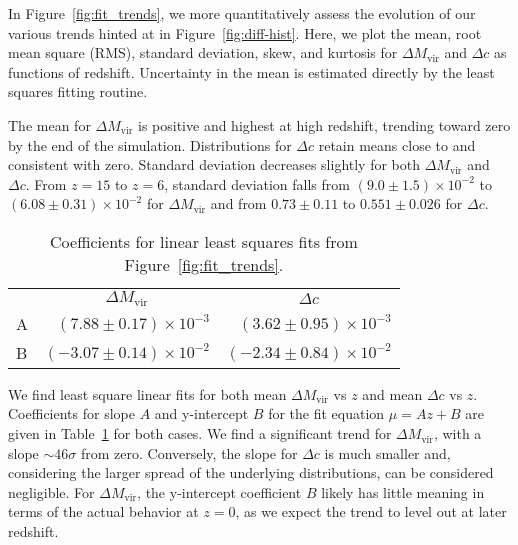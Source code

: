 In Figure~\ref{fig:fit_trends}, we more quantitatively assess the evolution of our various trends hinted at in Figure~\ref{fig:diff-hist}.  Here, we plot the mean, root mean square (RMS), standard deviation, skew, and kurtosis for $\Delta M_{\mathrm{vir}}$ and $\Delta c$ as functions of redshift.  Uncertainty in the mean is estimated directly by the least squares fitting routine.

The mean for $\Delta M_{\mathrm{vir}}$ is positive and highest at high redshift, trending toward zero by the end of the simulation.  Distributions for $\Delta c$ retain means close to and consistent with zero.  Standard deviation decreases slightly for both $\Delta M_{\mathrm{vir}}$ and $\Delta c$.  From $z = 15$ to $z = 6$, standard deviation falls from $(9.0 \pm 1.5) \times 10^{-2}$ to $(6.08 \pm 0.31) \times 10^{-2}$ for $\Delta M_{\mathrm{vir}}$ and from $0.73 \pm 0.11$ to $0.551 \pm 0.026$ for $\Delta c$.

\begin{table}[t]
	\centering
	\caption{Coefficients for linear least squares fits from Figure~\ref{fig:fit_trends}.}
	\begin{tabular}{ l  r  r }
		\toprule
		& \multicolumn{1}{c}{$\Delta M_{\mathrm{vir}}$} & \multicolumn{1}{c}{$\Delta c$} \\
		\cmidrule(l){2-3}
		A &  $(7.88 \pm 0.17) \times 10^{-3}$ &  $(3.62 \pm 0.95) \times 10^{-3}$ \\
		B & $(-3.07 \pm 0.14) \times 10^{-2}$ & $(-2.34 \pm 0.84) \times 10^{-2}$ \\
		\bottomrule
	\end{tabular}
	\label{tab:coeffs}
\end{table}

We find least square linear fits for both mean $\Delta M_{\mathrm{vir}}$ vs $z$ and mean $\Delta c$ vs $z$.  Coefficients for slope $A$ and y-intercept $B$ for the fit equation $\mu = A z + B$ are given in Table~\ref{tab:coeffs} for both cases.  We find a significant trend for $\Delta M_{\mathrm{vir}}$, with a slope $\sim 46 \sigma$ from zero.  Conversely, the slope for $\Delta c$ is much smaller and, considering the larger spread of the underlying distributions, can be considered negligible.  For $\Delta M_{\mathrm{vir}}$, the y-intercept coefficient $B$ likely has little meaning in terms of the actual behavior at $z = 0$, as we expect the trend to level out at later redshift.

